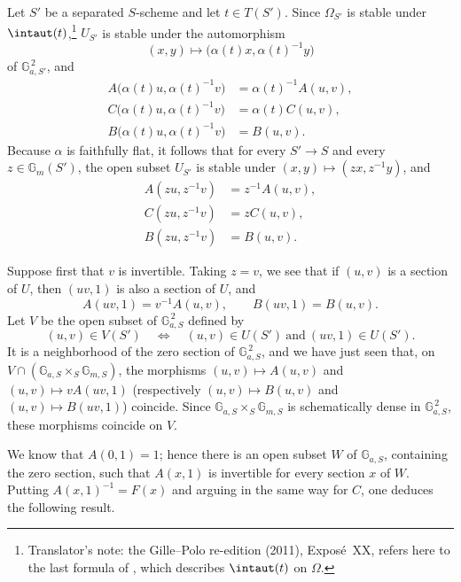 Let \(S'\) be a separated \(S\)-scheme and let \(t\in T(S')\).
Since \(\Omega_{S'}\) is stable under \(\intaut(t)\),\footnote{Translator's note: the Gille--Polo re-edition (2011), Exposé~XX, refers here to
the last formula of , which describes \(\intaut(t)\) on \(\Omega\).}
\(U_{S'}\) is stable under the
automorphism
\[
  (x,y)\longmapsto
    \bigl(\alpha(t)x,\alpha(t)^{-1}y\bigr)
\]
of \(\mathbb G_{a,S'}^{\,2}\), and
\[
\begin{aligned}
 A\bigl(\alpha(t)u,\alpha(t)^{-1}v\bigr)
   &=\alpha(t)^{-1}A(u,v),\\
 C\bigl(\alpha(t)u,\alpha(t)^{-1}v\bigr)
   &=\alpha(t)C(u,v),\\
 B\bigl(\alpha(t)u,\alpha(t)^{-1}v\bigr)
   &=B(u,v).
\end{aligned}
\]
Because \(\alpha\) is faithfully flat, it follows that for every
\(S'\to S\) and every \(z\in\mathbb G_m(S')\), the open subset
\(U_{S'}\) is stable under
\((x,y)\mapsto(zx,z^{-1}y)\), and
\[
\begin{aligned}
  A(zu,z^{-1}v)&=z^{-1}A(u,v),\\
  C(zu,z^{-1}v)&=zC(u,v),\\
  B(zu,z^{-1}v)&=B(u,v).
\end{aligned}
\]

Suppose first that \(v\) is invertible. Taking \(z=v\), we see
that if \((u,v)\) is a section of \(U\), then \((uv,1)\) is also
a section of \(U\), and
\[
  A(uv,1)=v^{-1}A(u,v),\qquad
  B(uv,1)=B(u,v).
\]
Let \(V\) be the open subset of \(\mathbb G_{a,S}^{\,2}\) defined
by
\[
  (u,v)\in V(S')
  \quad\Longleftrightarrow\quad
  (u,v)\in U(S')\ \text{and}\ (uv,1)\in U(S').
\]
It is a neighborhood of the zero section of
\(\mathbb G_{a,S}^{\,2}\), and we have just seen that, on
\(V\cap(\mathbb G_{a,S}\times_S\mathbb G_{m,S})\), the morphisms
\((u,v)\mapsto A(u,v)\) and \((u,v)\mapsto vA(uv,1)\)
(respectively \((u,v)\mapsto B(u,v)\) and \((u,v)\mapsto B(uv,1)\))
coincide. Since
\(\mathbb G_{a,S}\times_S\mathbb G_{m,S}\) is schematically dense
in \(\mathbb G_{a,S}^{\,2}\), these morphisms coincide on \(V\).

We know that \(A(0,1)=1\); hence there is an open subset \(W\) of
\(\mathbb G_{a,S}\), containing the zero section, such that
\(A(x,1)\) is invertible for every section \(x\) of \(W\). Putting
\(A(x,1)^{-1}=F(x)\) and arguing in the same way for \(C\), one
deduces the following result.

